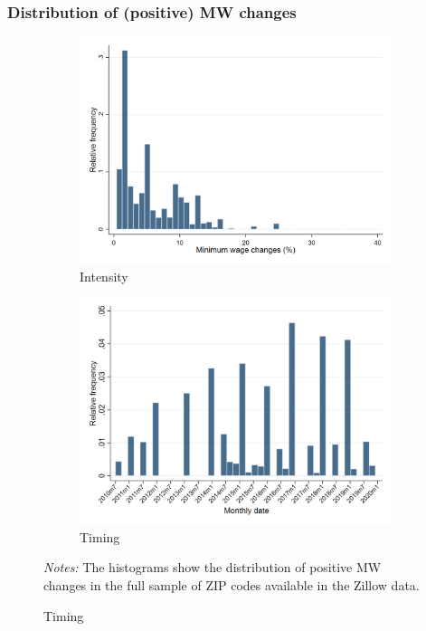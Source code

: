 \documentclass[aspectratio=169, t]{beamer}
\begin{document}
\begin{frame}[label=dist_mw_changes]
	\frametitle{Distribution of (positive) MW changes}
	
	\begin{figure}[h!]	\centering
		\begin{subfigure}{.49\textwidth}
			\caption{Intensity}
			\includegraphics[width = .91\textwidth]
			{descriptive/output/pct_ch_mw_dist.png}
		\end{subfigure}%
		\begin{subfigure}{.49\textwidth}
			\caption{Timing}
			\includegraphics[width = .91\textwidth]
			{descriptive/output/pct_ch_mw_date_dist.png}
		\end{subfigure}
		\begin{minipage}{.95\textwidth} \scriptsize \vspace{1mm}
			\textit{Notes:} The histograms show the distribution of positive MW changes 
			in the full sample of ZIP codes available in the Zillow data.
		\end{minipage}
	\end{figure}
	
	\hyperlink{stat_MW}{}
\end{frame}
\end{document}
